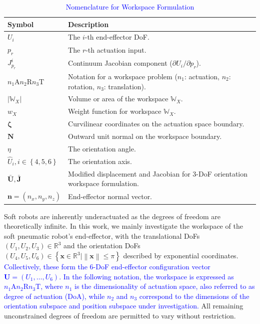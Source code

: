 \documentclass[journal]{IEEEtran}
\theoremstyle{definition}
\begin{document}
\begin{table}[h!]
\caption{\textcolor{blue}{Nomenclature for Workspace Formulation}}
\label{tab:nomenclature_workspace}
\centering
\renewcommand{\arraystretch}{1.2}
\begin{tabular}{lp{5.5cm}}
\toprule
\textbf{Symbol} & \textbf{Description} \\
\midrule
$U_i$ & The $i$-th end-effector DoF. \\
$p_r$ & The $r$-th actuation input. \\
$J^i_{p_r}$ & Continuum Jacobian component ($\partial U_i / \partial p_r$). \\
$n_1\text{A}n_2\text{R}n_3\text{T}$ & Notation for a workspace problem ($n_1$: actuation, $n_2$: rotation, $n_3$: translation). \\
$|\mathbb{W}_{X}|$ & Volume or area of the workspace $\mathbb{W}_{X}$. \\
$w_{X}$ & Weight function for workspace $\mathbb{W}_{X}$. \\
$\boldsymbol{\zeta}$ & Curvilinear coordinates on the actuation space boundary. \\
$\mathbf{N}$ & Outward unit normal on the workspace boundary. \\
$\eta$ & The orientation angle. \\
$\hat{U}_i, i\in\left\{4,5,6\right\}$ & The orientation axis. \\
$\bar{\mathbf{U}}, \bar{\mathbf{J}}$ & Modified displacement and Jacobian for 3-DoF orientation workspace formulation. \\
$\mathbf{n}=\left(n_x,n_y,n_z\right)$ & End-effector normal vector. \\
\bottomrule
\end{tabular}
\end{table}

Soft robots are inherently underactuated as the degrees of freedom are theoretically infinite. In this work, we mainly investigate the workspace of the soft pneumatic robot's end-effector, with the translational DoFs \( (U_1, U_2, U_3) \in \mathbb{R}^3 \) and the orientation DoFs \((U_4, U_5, U_6) \in \left\{\mathbf{x}\in \mathbb{R}^3 | \left\|\mathbf{x}\right\| \leq \pi\right\}\) described by exponential coordinates. \textcolor{blue}{Collectively, these form the 6-DoF end-effector configuration vector $\mathbf{U} = (U_1, \dots, U_6)$.} \textcolor{blue}{In the following notation, the workspace is expressed as $n_1 \text{A} n_2 \text{R} n_3 \text{T}$, where $n_1$ is the dimensionality of actuation space, also referred to as degree of actuation (DoA), while $n_2$ and $n_3$ correspond to the dimensions of the orientation subspace and position subspace under investigation.} All remaining unconstrained degrees of freedom are permitted to vary without restriction.
\end{document}
